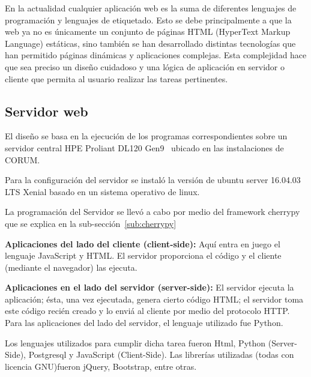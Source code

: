 \documentclass[journal,transmag]{IEEEtran}
\begin{document}
En la actualidad cualquier aplicación web es la suma de diferentes lenguajes de programación y lenguajes de etiquetado. Esto se debe principalmente a que la web ya no es únicamente un conjunto de páginas HTML (HyperText Markup Language) estáticas, sino también se han desarrollado distintas tecnologías que han permitido páginas dinámicas y aplicaciones complejas. Esta complejidad hace que sea preciso un diseño cuidadoso y una lógica de aplicación en servidor o cliente que permita al usuario realizar las tareas pertinentes. 


\subsection{Servidor web}
El diseño se basa en la ejecución de los programas correspondientes sobre un servidor central HPE Proliant DL120 Gen9~\cite{Manual2018} ubicado en las instalaciones de CORUM.

Para la configuración del servidor se instaló la versión de ubuntu server 16.04.03 LTS Xenial basado en un sistema operativo de linux.

La programación del Servidor se llevó a cabo por medio del framework cherrypy que se explica en la sub-sección~\ref{sub:cherrypy}

\textbf{Aplicaciones del lado del cliente (client-side):} Aquí entra en juego el lenguaje JavaScript y HTML. El servidor proporciona el código y el cliente (mediante el navegador) las ejecuta. 

\textbf{Aplicaciones en el lado del servidor (server-side):} El servidor ejecuta la aplicación; ésta, una vez ejecutada, genera cierto código HTML; el servidor toma este código recién creado y lo enviá al cliente por medio del protocolo HTTP. Para las aplicaciones del lado del servidor, el lenguaje utilizado fue  Python.

Los lenguajes utilizados para cumplir dicha tarea fueron Html, Python (Server-Side), Postgresql y JavaScript (Client-Side). Las librerías utilizadas (todas con licencia GNU)fueron jQuery, Bootstrap, entre otras.
\end{document}
